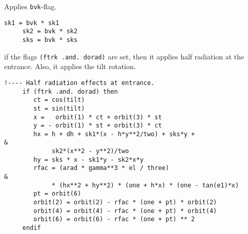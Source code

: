 \documentclass{cern-art} %
\begin{document}
Applies \lstinline[firstnumber=last]{bvk}-flag.
 \begin{lstlisting}[firstnumber=last]
     sk1 = bvk * sk1
     sk2 = bvk * sk2
     sks = bvk * sks
  \end{lstlisting}
  if the flags \lstinline[firstnumber=last]{(ftrk .and. dorad)} are set, then it applies half radiation at the entrance. Also, it applies the tilt rotation.
 \begin{lstlisting}[firstnumber=last]
     !---- Half radiation effects at entrance.
     if (ftrk .and. dorad) then
        ct = cos(tilt)
        st = sin(tilt)
        x =   orbit(1) * ct + orbit(3) * st
        y = - orbit(1) * st + orbit(3) * ct
        hx = h + dh + sk1*(x - h*y**2/two) + sks*y +                  &
             sk2*(x**2 - y**2)/two
        hy = sks * x - sk1*y - sk2*x*y
        rfac = (arad * gamma**3 * el / three)                         &
             * (hx**2 + hy**2) * (one + h*x) * (one - tan(e1)*x)
        pt = orbit(6)
        orbit(2) = orbit(2) - rfac * (one + pt) * orbit(2)
        orbit(4) = orbit(4) - rfac * (one + pt) * orbit(4)
        orbit(6) = orbit(6) - rfac * (one + pt) ** 2
     endif
  \end{lstlisting}


\end{document}
